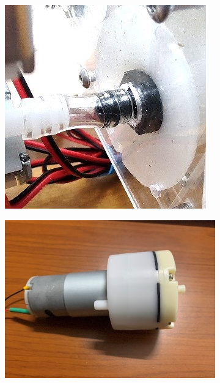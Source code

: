\documentclass[twoside]{article}
\begin{document}
\begin{figure}[H]
	\centering
	\begin{subfigure}[b]{0.33\linewidth}
		\centering
		\includegraphics[width=\textwidth]{air_connection}
	\end{subfigure}%
	\begin{subfigure}[b]{0.33\linewidth}
		\centering		
		\includegraphics[width=\textwidth]{air_pump}

\end{subfigure}
\end{figure}
\end{document}
